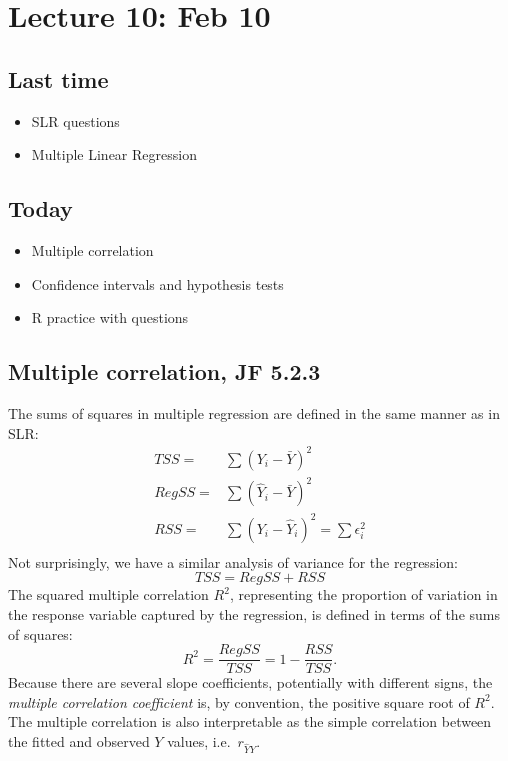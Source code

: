 \setcounter{section}{9}


\section{Lecture 10: Feb 10}


\subsection*{Last time}
\begin{itemize}
  \item SLR questions
  \item Multiple Linear Regression
\end{itemize}


\subsection*{Today}
\begin{itemize}
  \item Multiple correlation
  \item Confidence intervals and hypothesis tests
  \item R practice with questions
\end{itemize}



\subsection*{Multiple correlation, JF 5.2.3}
The sums of squares in multiple regression are defined in the same manner as in SLR:
$$
\begin{aligned}
  TSS =& \sum (Y_i - \bar{Y})^2\\
  RegSS =& \sum (\hat{Y}_i - \bar{Y})^2\\
  RSS =&  \sum(Y_i - \hat{Y}_i)^2 = \sum \epsilon_i^2\\
\end{aligned}
$$
%
Not surprisingly, we have a similar analysis of variance for the regression:
$$
TSS = RegSS + RSS
$$
%
The squared multiple correlation $R^2$, representing the proportion of variation in the response variable captured by the regression, is defined in terms of the sums of squares:
$$
R^2 = \frac{RegSS}{TSS} = 1 - \frac{RSS}{TSS}.
$$
Because there are several slope coefficients, potentially with different signs, the {\it multiple correlation coefficient} is, by convention, the positive square root of $R^2$.
The multiple correlation is also interpretable as the simple correlation between the fitted and observed $Y$ values, i.e.~$r_{\hat{Y}Y}$.

